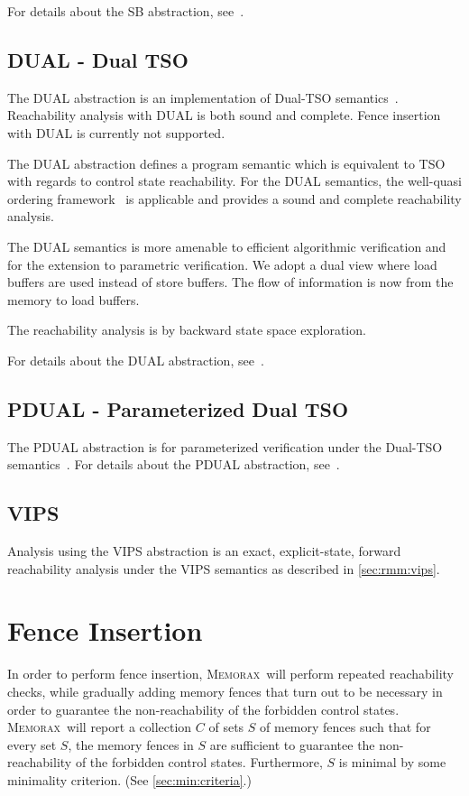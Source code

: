 \documentclass[a4paper]{article}
\newcommand{\memorax}{\textsc{Memorax}}
\begin{document}
For details about the SB abstraction, see~\cite{AACLR12}.

\subsection{DUAL - Dual TSO}

The DUAL abstraction is an implementation of Dual-TSO semantics~\cite{lmcs:4228,AbdullaABN16}. 
Reachability analysis with DUAL is
both sound and complete. Fence insertion with DUAL is currently not supported. 

The DUAL abstraction defines a program semantic which is equivalent to
TSO with regards to control state reachability. For the DUAL semantics,
the well-quasi ordering framework~\cite{ACJT96} is applicable and
provides a sound and complete reachability analysis.

The DUAL semantics is more amenable to efficient algorithmic verification and for the extension to parametric verification. We adopt a dual view where load buffers are used instead of store buffers. The flow of information is now from the memory to load buffers.

The reachability analysis is by backward state space exploration.

For details about the DUAL abstraction, see~\cite{lmcs:4228,AbdullaABN16}.

\subsection{PDUAL - Parameterized Dual TSO}

The PDUAL abstraction is for parameterized verification under
the Dual-TSO semantics~\cite{lmcs:4228,AbdullaABN16}. For details about the PDUAL abstraction, see~\cite{lmcs:4228,AbdullaABN16}.

\subsection{VIPS}

Analysis using the VIPS abstraction is an exact, explicit-state,
forward reachability analysis under the VIPS semantics as described in
\cref{sec:rmm:vips}.

\section{Fence Insertion}

In order to perform fence insertion, \memorax\ will perform repeated
reachability checks, while gradually adding memory fences that turn
out to be necessary in order to guarantee the non-reachability of the
forbidden control states. \memorax\ will report a collection $C$ of
sets $S$ of memory fences such that for every set $S$, the memory
fences in $S$ are sufficient to guarantee the non-reachability of the
forbidden control states. Furthermore, $S$ is minimal by some
minimality criterion. (See \cref{sec:min:criteria}.)
\end{document}
